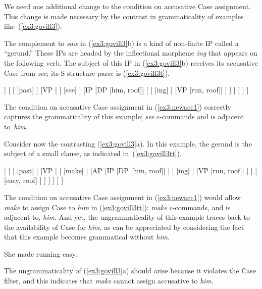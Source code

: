 We need one additional change to the condition on accusative Case assignment. This change is made necessary by the contrast in grammaticality of examples like~(\ref{ex3:govill3}).
\begin{exe}
\ex \label{ex3:govill3}
\begin{xlist}
\end{xlist}
\end{exe}
The complement to \emph{saw} in (\ref{ex3:govill3}b) is a kind of non-finite IP called a ``gerund.'' These IPs are headed by the inflectional morpheme \emph{ing} that appears on the following verb. The subject of this IP in (\ref{ex3:govill3}b) receives its accusative Case from \emph{see}; its S-structure parse is (\ref{ex3:govill3t}). 
\begin{exe}
	\ex \label{ex3:govill3t} 
	\small
	\begin{forest}
	[IP
		[DP [she, roof]]
		[ 
			[ [past] ]
			[VP [
				[ [see] ]
				[IP
					[DP [him, roof]]
					[
						[ [ing] ]
						[VP [run, roof]]
					 ]
				 ]
			] ]
		]
	]
	\end{forest}
\end{exe}
The condition on accusative Case assignment in (\ref{ex3:newacc1}) correctly captures the grammaticality of this example; \emph{see} c-commands and is adjacent to~\emph{him}.

Consider now the contrasting (\ref{ex3:govill3}a). In this example, the gerund is the subject of a small clause, as indicated in~(\ref{ex3:govill3tt}). 
\begin{exe}
\ex \label{ex3:govill3tt} 
\small
\begin{forest}
[IP
	[DP [she, roof]]
	[\ibar{I} 
		[ [past] ]
		[VP [\ibar{V}
			[ [make] ]
			[AP
				[IP
					[DP [him, roof]]
					[\ibar{I}
						[\obar{I} [ing] ]
						[VP [run, roof]]
					 ]
				 ]
				[ [easy, roof] ]
			 ]
		] ]
	]
]
\end{forest}
\end{exe}
The condition on accusative Case assignment in (\ref{ex3:newacc1}) would allow \emph{make} to assign Case to \emph{him} in (\ref{ex3:govill3tt}): \emph{make} c-commands, and is adjacent to, \emph{him}. And yet, the ungrammaticality of this example traces back to the availability of Case for \emph{him}, as can be appreciated by considering the fact that this example becomes grammatical without \emph{him}.
\begin{exe}
\ex \label{ex3:govill4} She made running easy.
\end{exe}
The ungrammaticality of (\ref{ex3:govill3}a) should arise because it violates the Case filter, and this indicates that \emph{make} cannot assign accusative to \emph{him}.


